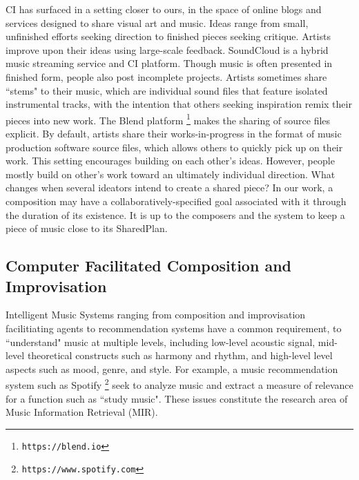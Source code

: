 \documentclass[final,authoryear,5p,times,twocolumn]{elsarticle}
\begin{document}
CI has surfaced in a setting closer to ours, in the space of online blogs and services designed to share visual art and music. Ideas range from small, unfinished efforts seeking direction to finished pieces seeking critique. Artists improve upon their ideas using large-scale feedback. SoundCloud is a hybrid music streaming service and CI platform. Though music is often presented in finished form, people also post incomplete projects. Artists sometimes share ``stems" to their music, which are individual sound files that feature isolated instrumental tracks, with the intention that others seeking inspiration remix their pieces into new work. The Blend platform \footnote{\texttt{https://blend.io}} makes the sharing of source files explicit. By default, artists share their works-in-progress in the format of music production software source files, which allows others to quickly pick up on their work. This setting encourages building on each other's ideas. However, people mostly build on other's work toward an ultimately individual direction. What changes when several ideators intend to create a shared piece? In our work, a composition may have a collaboratively-specified goal associated with it through the duration of its existence. It is up to the composers and the system to keep a piece of music close to its SharedPlan.

\subsection{Computer Facilitated Composition and Improvisation}

Intelligent Music Systems ranging from composition and improvisation facilitiating agents to recommendation systems have a common requirement, to ``understand" music at multiple levels, including low-level acoustic signal, mid-level theoretical constructs such as harmony and rhythm, and high-level level aspects such as mood, genre, and style. For example, a music recommendation system such as Spotify \footnote{\texttt{https://www.spotify.com}} seek to analyze music and extract a measure of relevance for a function such as ``study music". These issues constitute the research area of Music Information Retrieval (MIR).
\end{document}
